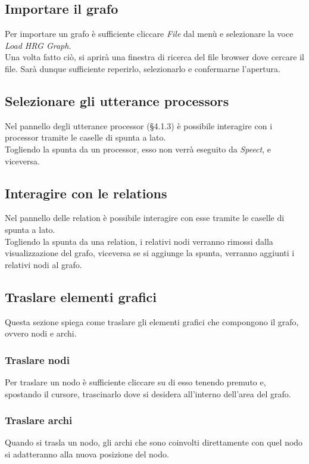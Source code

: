 \documentclass[openany,12pt,a4paper]{report}
\begin{document}
	\subsection{Importare il grafo}
	Per importare un grafo è sufficiente cliccare \textit{File} dal menù e selezionare la voce \textit{Load HRG Graph}.\\
	Una volta fatto ciò, si aprirà una finestra di ricerca del file browser dove cercare il file. Sarà dunque sufficiente reperirlo, selezionarlo e confermarne l'apertura.
	
	\subsection{Selezionare gli utterance processors}
	Nel pannello degli utterance processor (§4.1.3) è possibile interagire con i processor tramite le caselle di spunta a lato.\\
	Togliendo la spunta da un processor, esso non verrà eseguito da \textit{Speect}, e viceversa.
	
	\subsection{Interagire con le relations}
	Nel pannello delle relation è possibile interagire con esse tramite le caselle di spunta a lato.\\
	Togliendo la spunta da una relation, i relativi nodi verranno rimossi dalla visualizzazione del grafo, viceversa se si aggiunge la spunta, verranno aggiunti i relativi nodi al grafo.
	
	\subsection{Traslare elementi grafici}
	Questa sezione spiega come traslare gli elementi grafici che compongono il grafo, ovvero nodi e archi.
	
	\subsubsection{Traslare nodi}
	Per traslare un nodo è sufficiente cliccare su di esso tenendo premuto e, spostando il cursore, trascinarlo dove si desidera all'interno dell'area del grafo.
	
	\subsubsection{Traslare archi}
	Quando si trasla un nodo, gli archi che sono coinvolti direttamente con quel nodo si adatteranno alla nuova posizione del nodo.
	
\end{document}
